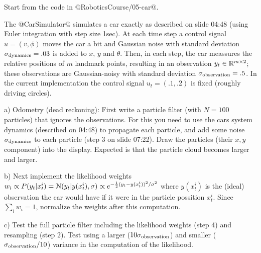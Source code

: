 

\renewcommand{\course}{Robotics}
\renewcommand{\coursepicture}{roboticsLecture}
\renewcommand{\coursedate}{Winter 2014}
\renewcommand{\exnum}{9}

\exercises


\exercisestitle



Start from the code in @RoboticsCourse/05-car@.

The @CarSimulator@ simulates a car exactly as described on slide 04:48
(using Euler integration with step size 1sec). At each time step a
control signal $u=(v,\phi)$ moves the car a bit and Gaussian noise
with standard deviation $\sigma_\text{dynamics}=.03$ is added to $x$, $y$
and $\theta$. Then, in each step, the car meassures the relative
positions of $m$ landmark points, resulting in an observation $y_t \in{\mathbb{R}}^
{m\times 2}$; these observations are Gaussian-noisy with standard
deviation $\sigma_\text{observation}=.5$. In the current implementation the
control signal $u_t=(.1,.2)$ is fixed (roughly driving circles).

a) Odometry (dead reckoning): First write a particle filter (with
$N=100$ particles) that ignores the observations. For this you need to
use the cars system dynamics (described on 04:48) to propagate each
particle, and add some noise $\sigma_\text{dynamics}$ to each particle
(step 3 on slide 07:22). Draw the particles (their $x,y$ component)
into the display. Expected is that the particle cloud becomes larger
and larger.

b) Next implement the likelihood weights $w_i \propto P(y_t | x^i_t) =
{\cal N}(y_t | y(x_t^i), \sigma) \propto e^{-\frac{1}{2} (y_t - y(x_t^i))^2/\sigma^2}$
where $y(x_t^i)$ is the (ideal) observation the car would have if it
were in the particle possition $x_t^i$. Since $\sum_i w_i = 1$,
normalize the weights after this computation.

c) Test the full particle filter including the likelihood weights
(step 4) and resampling (step 2). Test using a larger
($10\sigma_\text{observation}$) and smaller ($\sigma_\text{observation}/10$)
variance in the computation of the likelihood.




